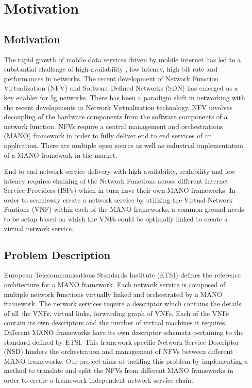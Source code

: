 \chapter{Motivation}
\label{ch:Motivation}

\section{Motivation}

The rapid growth of mobile data services driven by mobile internet has led to a substantial challenge of high availability , low latency, high bit rate and performances in networks. The recent development of Network Function Virtualization (NFV) and Software Defined Networks (SDN) has emerged as a key enabler for 5g networks. 
There has been a paradigm shift in networking with the recent developments in Network Virtualization technology. NFV involves decoupling of the hardware components from the software components of a network function. NFVs require a central management and orchestrations (MANO) framework  in order to fully deliver end to end services of an application. There are multiple open source as well as industrial implementation of a  MANO framework in the market. 

End-to-end network service delivery with high availability, scalability and low latency requires chaining of the Network Functions across different Internet Service Providers (ISPs) which in turn have their own MANO frameworks. In order to seamlessly create a network service by utilizing the Virtual Network Funtions (VNF) within each of the MANO frameworks, a common ground needs to be setup based on which the VNFs could be optimally linked to create a virtual network service.


\section{Problem Description}

European Telecommunications Standards Institute (ETSI) defines the reference architecture for a MANO framework. Each network service is composed of multiple network functions virtually linked and orchestrated by a MANO framework. The network services require a descriptor which contains the details of all the VNFs, virtual links, forwarding graph of VNFs. Each of the VNFs contain its own descriptors and the number of virtual machines it requires. Different MANO frameworks have its own descriptor schemata pertaining to the standard defined by ETSI. This framework specific Network Service Descriptor (NSD) hinders the orchestration and management of NFVs between different MANO frameworks. Our project aims at tackling this problem by implementing a method to translate and split the NFVs from different MANO frameworks in order to create a framework independent network service chain.


